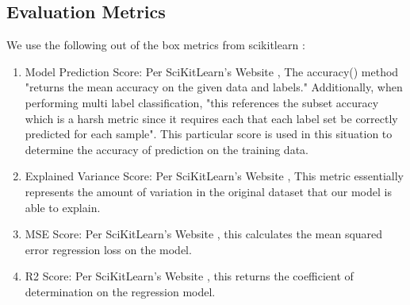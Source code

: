 \documentclass[titlepage]{article}
\begin{document}
	\subsection*{Evaluation Metrics}
	We use the following out of the box metrics from scikitlearn \cite{scikitlearn}:
	\begin{enumerate}
		\item  Model Prediction Score: Per SciKitLearn's Website \cite{scikitlearn}, The accuracy() method "returns the mean accuracy on the given data and labels." Additionally, when performing multi label classification, "this references the subset accuracy which is a harsh metric since it requires each that each label set be correctly predicted for each sample". This particular score is used in this situation to determine the accuracy of prediction on the training data.
	
		\item Explained Variance Score: Per SciKitLearn's Website \cite{scikitlearn}, This metric essentially represents the amount of variation in the original dataset that our model is able to explain.
		
		\item MSE Score: Per SciKitLearn's Website \cite{scikitlearn}, this calculates the mean squared error regression loss on the model.
		
		\item R2 Score: Per SciKitLearn's Website \cite{scikitlearn}, this returns the coefficient of determination on the regression model.
	\end{enumerate}
	
\end{document}
